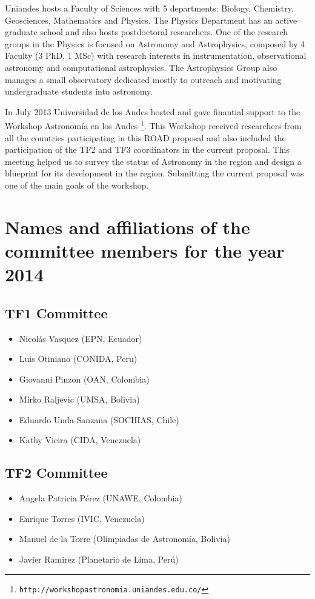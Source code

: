 \documentclass[12pt]{article}
\begin{document}
Uniandes hosts a Faculty of Sciences with 5 departments: Biology,
Chemistry, Geosciences, Mathematics and Physics. The Physics
Department has an active graduate school and also hosts postdoctoral
researchers. One of the research groups in the Physics is focused on
Astronomy and Astrophysics, composed by 4 Faculty (3 PhD, 1 MSc) with
research interests in instrumentation, observational astronomy and
computational astrophysics. The Astrophysics Group also manages a
small observatory dedicated mostly to outreach and motivating
undergraduate students into astronomy. 

In July 2013 Universidad de los Andes hosted and gave finantial
support to the Workshop Astronomía en los
Andes \footnote{\texttt{http://workshopastronomia.uniandes.edu.co/}}. This
Workshop received researchers from all the countries participating in
this ROAD proposal and also included the participation of the TF2 and
TF3 coordinators in the current proposal. This meeting helped us to
survey the status of Astronomy in the region and design a blueprint
for its development in the region. Submitting the current proposal was
one of the main goals of the workshop. 
 

\section{Names and affiliations of the committee members for the year 2014}

\subsection*{TF1 Committee}
\begin{itemize}
\item Nicol\'as Vasquez (EPN, Ecuador)
\item Luis Otiniano (CONIDA, Peru)
\item Giovanni Pinzon (OAN, Colombia)
\item Mirko Raljevic (UMSA, Bolivia)
\item Eduardo Unda-Sanzana (SOCHIAS, Chile)
\item Kathy Vieira (CIDA, Venezuela)
\end{itemize}

\subsection*{TF2 Committee}
\begin{itemize}
\item Angela Patricia Pérez (UNAWE, Colombia)
\item Enrique Torres  (IVIC, Venezuela)
\item Manuel de la Torre (Olimpiadas de Astronomía, Bolivia) 
\item Javier Ramirez (Planetario de Lima, Perú)
\end{itemize}
\end{document}
